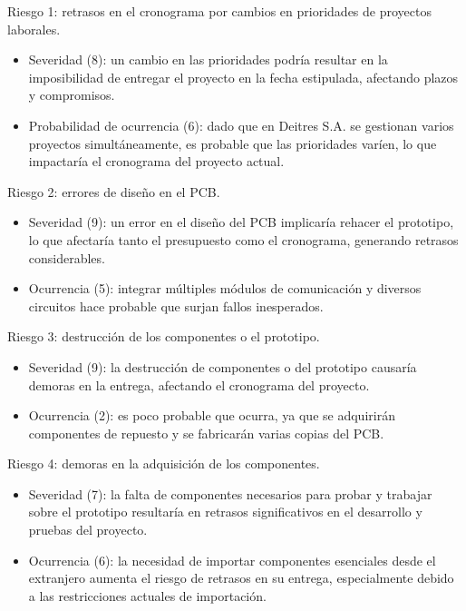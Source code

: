 \documentclass[
11pt, %
]{charter}
\begin{document}
Riesgo 1: retrasos en el cronograma por cambios en prioridades de proyectos laborales.
\begin{itemize}
	\item Severidad (8): un cambio en las prioridades podría resultar en la imposibilidad de entregar el proyecto en la fecha estipulada, afectando plazos y compromisos.\\
	\item Probabilidad de ocurrencia (6): dado que en Deitres S.A. se gestionan varios proyectos simultáneamente, es probable que las prioridades varíen, lo que impactaría el cronograma del proyecto actual.\\
\end{itemize}   

Riesgo 2: errores de diseño en el PCB.
\begin{itemize}
	\item Severidad (9): un error en el diseño del PCB implicaría rehacer el prototipo, lo que afectaría tanto el presupuesto como el cronograma, generando retrasos considerables.\\
	\item Ocurrencia (5): integrar múltiples módulos de comunicación y diversos circuitos hace probable que surjan fallos inesperados.\\
\end{itemize}   

\pagebreak
Riesgo 3: destrucción de los componentes o el prototipo.
\begin{itemize}
	\item Severidad (9):  la destrucción de componentes o del prototipo causaría demoras en la entrega, afectando el cronograma del proyecto.\\
	\item Ocurrencia (2):  es poco probable que ocurra, ya que se adquirirán componentes de repuesto y se fabricarán varias copias del PCB.\\
\end{itemize}   

Riesgo 4:  demoras en la adquisición de los componentes.
\begin{itemize}
	\item Severidad (7): la falta de componentes necesarios para probar y trabajar sobre el prototipo resultaría en retrasos significativos en el desarrollo y pruebas del proyecto.\\
	\item Ocurrencia (6): la necesidad de importar componentes esenciales desde el extranjero aumenta el riesgo de retrasos en su entrega, especialmente debido a las restricciones actuales de importación.\\
\end{itemize}   
\end{document}
